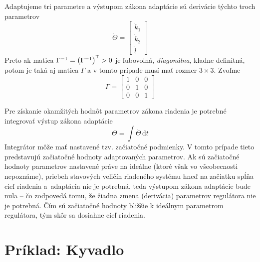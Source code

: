 \documentclass[a4paper, 10pt, ]{article}
\begin{document}
Adaptujeme tri parametre a výstupom zákona adaptácie sú derivácie týchto troch parametrov
\begin{equation}
	\dot \Theta = \begin{bmatrix} \dot{k}_1 \\ \dot{k}_2 \\ \dot{l} \end{bmatrix}
\end{equation}
Preto ak matica $\Gamma^{-1} = \left( \Gamma^{-1} \right)^{\mathsf{T}} > 0$ je ľubovolná, \emph{diagonálna}, kladne definitná, potom je taká aj matica $\Gamma$ a v tomto prípade musí mať rozmer $3\times3$. Zvoľme
\begin{equation}
	\Gamma =
    \begin{bmatrix}
		1 & 0 & 0 \\
		0 & 1 & 0 \\
		0 & 0 & 1
	\end{bmatrix}
\end{equation}



Pre získanie okamžitých hodnôt parametrov zákona riadenia je potrebné integrovať výstup zákona adaptácie
\begin{equation}
	\Theta = \int \dot \Theta \, \textrm{d}t
\end{equation}
Integrátor môže mať nastavené tzv. začiatočné podmienky. V tomto prípade tieto predstavujú začiatočné hodnoty adaptovaných parametrov. Ak sú začiatočné hodnoty parametrov nastavené práve na ideálne (ktoré však vo všeobecnosti nepoznáme), priebeh stavových veličín riadeného systému hneď na začiatku spĺňa cieľ riadenia a~adaptácia nie je potrebná, teda výstupom zákona adaptácie bude nula -- čo zodpovedá tomu, že žiadna zmena (derivácia) parametrov regulátora nie je potrebná. Čím sú začiatočné hodnoty bližšie k ideálnym parametrom regulátora, tým skôr sa dosiahne cieľ riadenia.






























\section{Príklad: Kyvadlo}
\end{document}
